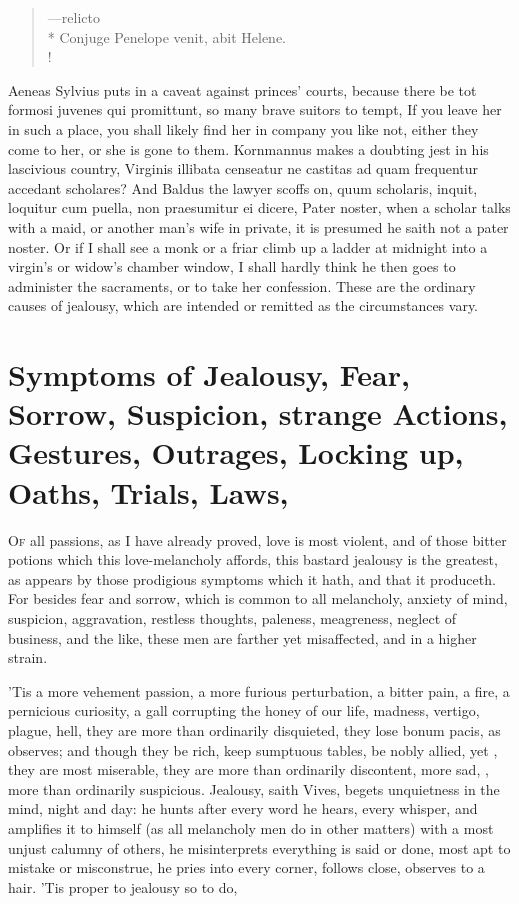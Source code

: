 \begin{latin}%
\begin{verse}%
---relicto\\*
Conjuge Penelope venit, abit Helene.\\!
\end{verse}%
\end{latin}%

Aeneas Sylvius puts in a caveat against princes' courts, because there
be tot formosi juvenes qui promittunt, so many brave suitors to tempt,
\etc{} If you leave her in such a place, you shall likely find her
in company you like not, either they come to her, or she is gone to
them. Kornmannus makes a doubting jest in his lascivious country,
Virginis illibata censeatur ne castitas ad quam frequentur accedant
scholares? And Baldus the lawyer scoffs on, quum scholaris, inquit,
loquitur cum puella, non praesumitur ei dicere, Pater noster, when a
scholar talks with a maid, or another man's wife in private, it is
presumed he saith not a pater noster. Or if I shall see a monk or a
friar climb up a ladder at midnight into a virgin's or widow's chamber
window, I shall hardly think he then goes to administer the sacraments,
or to take her confession. These are the ordinary causes of jealousy,
which are intended or remitted as the circumstances vary.


\section[Symptoms of Jealousy]{Symptoms of Jealousy, Fear, Sorrow, Suspicion, strange Actions, Gestures, Outrages, Locking up, Oaths, Trials, Laws, \etc{}}

\lettrine{O}{f} all passions, as I have already proved, love is most violent, and of
those bitter potions which this love-melancholy affords, this bastard
jealousy is the greatest, as appears by those prodigious symptoms which
it hath, and that it produceth. For besides fear and sorrow, which is
common to all melancholy, anxiety of mind, suspicion, aggravation,
restless thoughts, paleness, meagreness, neglect of business, and the
like, these men are farther yet misaffected, and in a higher strain.

'Tis a more vehement passion, a more furious perturbation, a bitter
pain, a fire, a pernicious curiosity, a gall corrupting the honey of
our life, madness, vertigo, plague, hell, they are more than ordinarily
disquieted, they lose bonum pacis, as \Chrysostom observes; and
though they be rich, keep sumptuous tables, be nobly allied, yet
, they are most miserable, they are more than
ordinarily discontent, more sad, , more than ordinarily
suspicious. Jealousy, saith Vives, begets unquietness in the
mind, night and day: he hunts after every word he hears, every whisper,
and amplifies it to himself (as all melancholy men do in other matters)
with a most unjust calumny of others, he misinterprets everything is
said or done, most apt to mistake or misconstrue, he pries into every
corner, follows close, observes to a hair. 'Tis proper to jealousy so
to do,

